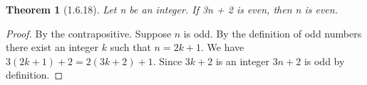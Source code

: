 \documentclass[a4paper, 12pt]{article}
\theoremstyle{plain}
\newtheorem*{theorem*}{Theorem}
\begin{document}
	
	\begin{theorem*}[1.6.18]
		Let n be an integer. If 3n + 2 is even, then n is even.
	\end{theorem*}
	
	\begin{proof}
		By the contrapositive. Suppose $n$ is odd. By the definition of odd numbers there exist an integer
		$k$ such that $n = 2k + 1$. We have \newline $3(2k + 1) + 2 = 2(3k + 2) + 1$. Since $3k + 2$ is an 
		integer $3n + 2$ is odd by definition.
	\end{proof}
\end{document}
